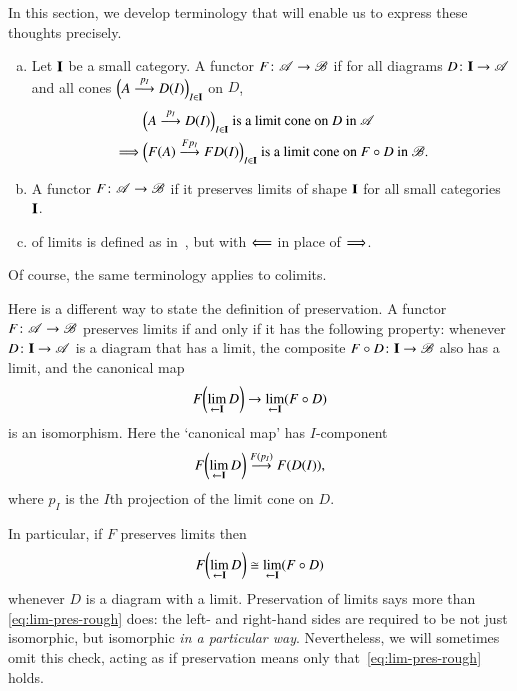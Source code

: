 In this section, we develop terminology that will enable us to express
these thoughts precisely.

\begin{defn}
\begin{enumerate}[(b)]
\item
\label{defn:pres-lims-shape}
Let $\mathbf{I}$ be a small category.  A functor $F\from \cat{A} \to \cat{B}$
 if for all diagrams $D\from \scat{I} \to
\cat{A}$ and all cones $\Bigl(A \stackrel{p_I}{\longrightarrow} D(I)\Bigr)_{I \in \mathbf{I}}$ on
$D$,
%
\begin{align*}
        &
\Bigl(A \stackrel{p_I}{\longrightarrow} D(I)\Bigr)_{I \in \mathbf{I}}
\text{ is a limit cone on } D \text{ in }\mathscr{A}\\
\implies        &
\Bigl(F(A) \stackrel{Fp_I}{\longrightarrow} FD(I)\Bigr)_{I \in \mathbf{I}}
\text{ is a limit cone on } F \mathbin{\circ} D \text{ in }\mathscr{B}.
\end{align*}

\item
\label{defn:pres-lims-all}
A functor $F\from \cat{A} \to \cat{B}$  if it
preserves limits of shape $\mathbf{I}$ for all small categories $\mathbf{I}$.

\item
{}%
%
%
%
of limits is defined as in~, but with $\Longleftarrow$
in place of $\Longrightarrow$.
\end{enumerate}
\end{defn}
%
Of course, the same terminology applies to colimits.

Here is a different way to state the definition of preservation.  A functor
$F\from \cat{A} \to \cat{B}$ preserves limits if and only if it has the
following property: whenever $D\from \scat{I} \to \cat{A}$ is a diagram
that has a limit, the composite $F \of D \from \scat{I} \to \cat{B}$ also
has a limit, and the canonical map
\[
F \biggl( \lim\limits_{\leftarrow \mathbf{I}} D \biggr)
\to
\lim\limits_{\leftarrow \mathbf{I}}(F \mathbin{\circ} D)
\]
is an isomorphism.  Here the `canonical map' has $I$-component
\[
F \biggl( \lim\limits_{\leftarrow \mathbf{I}} D \biggr)
\stackrel{F(p_I)}{\longrightarrow}
F(D(I)),
\]
where $p_I$ is the $I$th projection of the limit cone on $D$.

In particular, if $F$ preserves limits then
%
\begin{equation}
\label{eq:lim-pres-rough}
F \biggl( \lim\limits_{\leftarrow \mathbf{I}} D \biggr)
\cong
\lim\limits_{\leftarrow \mathbf{I}}(F \mathbin{\circ} D)
\end{equation}
%
whenever $D$ is a diagram with a limit.  Preservation of limits says more
than \eqref{eq:lim-pres-rough} does: the left- and right-hand sides are
required to be not just isomorphic, but isomorphic \emph{in a particular
  way}.  Nevertheless, we will sometimes omit this check, acting as if
preservation means only that~\eqref{eq:lim-pres-rough} holds.

